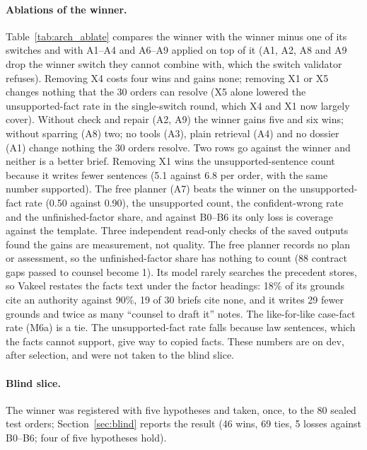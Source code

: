 \paragraph{Ablations of the winner.} Table~\ref{tab:arch_ablate} compares the winner with the winner minus one of its switches and with A1--A4 and A6--A9 applied on top of it (A1, A2, A8 and A9 drop the winner switch they cannot combine with, which the switch validator refuses). Removing X4 costs four wins and gains none; removing X1 or X5 changes nothing that the 30 orders can resolve (X5 alone lowered the unsupported-fact rate in the single-switch round, which X4 and X1 now largely cover). Without check and repair (A2, A9) the winner gains five and six wins; without sparring (A8) two; no tools (A3), plain retrieval (A4) and no dossier (A1) change nothing the 30 orders resolve. Two rows go against the winner and neither is a better brief. Removing X1 wins the unsupported-sentence count because it writes fewer sentences (5.1 against 6.8 per order, with the same number supported). The free planner (A7) beats the winner on the unsupported-fact rate (0.50 against 0.90), the unsupported count, the confident-wrong rate and the unfinished-factor share, and against B0--B6 its only loss is coverage against the template. Three independent read-only checks of the saved outputs found the gains are measurement, not quality. The free planner records no plan or assessment, so the unfinished-factor share has nothing to count (88 contract gaps passed to counsel become 1). Its model rarely searches the precedent stores, so Vakeel restates the facts text under the factor headings: 18\% of its grounds cite an authority against 90\%, 19 of 30 briefs cite none, and it writes 29 fewer grounds and twice as many ``counsel to draft it'' notes. The like-for-like case-fact rate (M6a) is a tie. The unsupported-fact rate falls because law sentences, which the facts cannot support, give way to copied facts. These numbers are on dev, after selection, and were not taken to the blind slice.

\paragraph{Blind slice.} The winner was registered with five hypotheses and taken, once, to the 80 sealed test orders; Section~\ref{sec:blind} reports the result (46 wins, 69 ties, 5 losses against B0--B6; four of five hypotheses hold).
